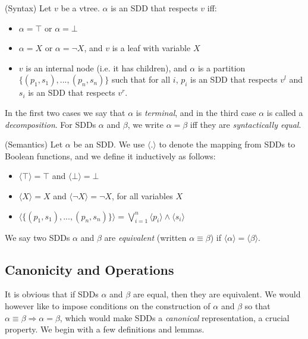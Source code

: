 \documentclass[11pt]{report}
\newenvironment{definition}[1][Definition]{\begin{trivlist}
\item[\hskip \labelsep {\bfseries #1}]}{\end{trivlist}}
\begin{document}
\begin{definition} (Syntax) Let $v$ be a vtree. $\alpha$ is an SDD that respects $v$ iff: 
\begin{itemize} 
\item $\alpha = \top$ or $\alpha = \bot$
\item $\alpha = X$ or $\alpha = \lnot X$, and $v$ is a leaf with variable $X$
\item $v$ is an internal node (i.e. it has children), and $\alpha$ is a partition  $\{(p_1, s_1), ..., (p_n, s_n)\}$ such that for all $i$, $p_i$ is an SDD that respects $v^l$ and $s_i$ is an SDD that respects $v^r$.
\end{itemize}
In the first two cases we say that $\alpha$ is \textit{terminal}, and in the third case $\alpha$ is called a \textit{decomposition}. For SDDs $\alpha$ and $\beta$, we write $\alpha = \beta$ iff they are \textit{syntactically equal}.
\end{definition}

\begin{definition} (Semantics)
Let $\alpha$ be an SDD. We use $\langle . \rangle$ to denote the mapping from SDDs to Boolean functions, and we define it inductively as follows: 
\begin{itemize} 
\item $\langle \top \rangle = \top$ and  $\langle \bot \rangle = \bot$
\item $\langle X \rangle = X$ and $\langle \lnot X \rangle = \lnot X$, for all variables $X$
\item $\langle\{(p_1, s_1), ..., (p_n, s_n)\}\rangle = \bigvee_{i = 1}^n \langle p_i \rangle \land \langle s_i \rangle  $
\end{itemize}
We say two SDDs $\alpha$ and $\beta$ are \textit{equivalent} (written $\alpha \equiv \beta$) if $\langle \alpha \rangle = \langle \beta \rangle$.

\end{definition}

\subsection{Canonicity and Operations} 

It is obvious that if SDDs $\alpha$ and $\beta$ are equal, then they are equivalent. We would however like 
to impose conditions on the construction of $\alpha$ and $\beta$  so that $\alpha \equiv \beta \Rightarrow \alpha = \beta$, which would make SDDs a \textit{canonical }representation, a crucial property.
We begin with a few definitions and lemmas.
\end{document}
